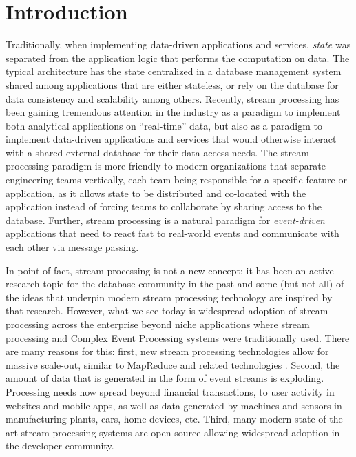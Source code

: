 
\section{Introduction}
\label{sec:intro}

Traditionally, when implementing data-driven applications and services, \emph{state} was separated from the application logic that performs the computation on data. The typical architecture has the state centralized in a database management system shared among applications that are either stateless, or rely on the database for data consistency and scalability among others. Recently, stream processing has been gaining tremendous attention in the industry as a paradigm to implement both analytical applications on ``real-time'' data, but also as a paradigm to implement data-driven applications and services that would otherwise interact with a shared external database for their data access needs. The stream processing paradigm is more friendly to modern organizations that separate engineering teams vertically, each team being responsible for a specific feature or application, as it allows state to be distributed and co-located with the application instead of forcing teams to collaborate by sharing access to the database. Further, stream processing is a natural paradigm for \emph{event-driven} applications that need to react fast to real-world events and communicate with each other via message passing. 

In point of fact, stream processing is not a new concept; it has been an active research topic for the database community in the past \cite{cherniack2003scalable,chandrasekaran2003telegraphcq,abadi2003aurora,arasu2004stream} and some (but not all) of the ideas that underpin modern stream processing technology are inspired by that research. However, what we see today is widespread adoption of stream processing across the enterprise beyond niche applications where stream processing and Complex Event Processing systems were traditionally used. There are many reasons for this: first, new stream processing technologies allow for massive scale-out, similar to MapReduce \cite{dean2008mapreduce} and related technologies \cite{zaharia2010spark,stratosphere,battre2010nephele}. Second, the amount of data that is generated in the form of event streams is exploding. Processing needs now spread beyond financial transactions, to user activity in websites and mobile apps, as well as data generated by machines and sensors in manufacturing plants, cars, home devices, etc. Third, many modern state of the art stream processing systems are open source allowing widespread adoption in the developer community. 

